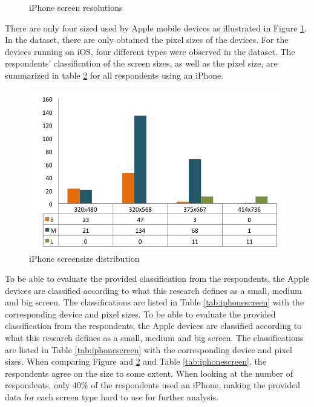 \begin{figure}[H]
{        \label{fig:iphone55}
      }

      \caption{iPhone screen resolutions}
      \label{fig:iphonescreenresolutions}
    \end{figure}

    There are only four sized used by Apple mobile devices as illustrated in Figure \ref{fig:iphonescreenresolutions}. In the dataset, there are only obtained the pixel sizes of the devices. For the devices running on iOS, four different types were observed in the dataset. The respondents' classification of the screen sizes, as well as the pixel size, are summarized in table \ref{fig:iphoneScreenDist} for all respondents using an iPhone.

    \begin{figure}[H]
      \centering
      \includegraphics[scale=0.75]{pics/analysis/IphoneScreenDist.png}
      \caption{iPhone screensize distribution}
      \label{fig:iphoneScreenDist}
    \end{figure}

    To be able to evaluate the provided classification from the respondents, the Apple devices are classified according to what this research defines as a small, medium and big screen. The classifications are listed in Table \ref{tab:iphonescreen} with the corresponding device and pixel sizes. To be able to evaluate the provided classification from the respondents, the Apple devices are classified according to what this research defines as a small, medium and big screen. The classifications are listed in Table \ref{tab:iphonescreen} with the corresponding device and pixel sizes. When comparing Figure and \ref{fig:iphoneScreenDist} and Table \ref{tab:iphonescreen}, the respondents agree on the size to some extent. When looking at the number of respondents, only 40\% of the respondents used an iPhone, making the provided data for each screen type hard to use for further analysis. 


